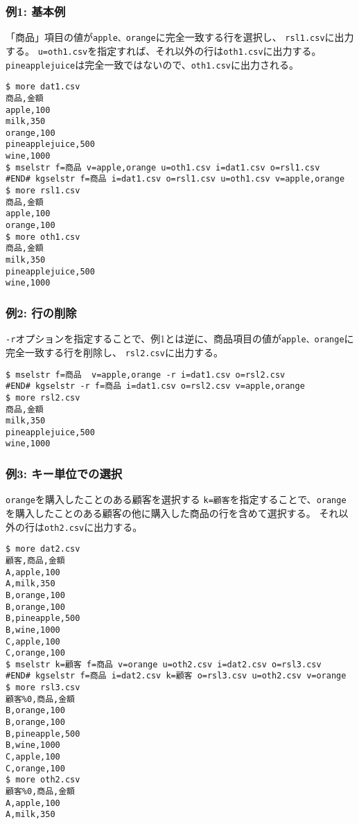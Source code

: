 \subsubsection*{例1: 基本例}

「商品」項目の値が\verb|apple、orange|に完全一致する行を選択し、
\verb|rsl1.csv|に出力する。
\verb|u=oth1.csv|を指定すれば、それ以外の行は\verb|oth1.csv|に出力する。
\verb|pineapplejuice|は完全一致ではないので、\verb|oth1.csv|に出力される。


\begin{Verbatim}[baselinestretch=0.7,frame=single]
$ more dat1.csv
商品,金額
apple,100
milk,350
orange,100
pineapplejuice,500
wine,1000
$ mselstr f=商品 v=apple,orange u=oth1.csv i=dat1.csv o=rsl1.csv
#END# kgselstr f=商品 i=dat1.csv o=rsl1.csv u=oth1.csv v=apple,orange
$ more rsl1.csv
商品,金額
apple,100
orange,100
$ more oth1.csv
商品,金額
milk,350
pineapplejuice,500
wine,1000
\end{Verbatim}
\subsubsection*{例2: 行の削除}

\verb|-r|オプションを指定することで、例1とは逆に、商品項目の値が\verb|apple、orange|に完全一致する行を削除し、
\verb|rsl2.csv|に出力する。


\begin{Verbatim}[baselinestretch=0.7,frame=single]
$ mselstr f=商品  v=apple,orange -r i=dat1.csv o=rsl2.csv
#END# kgselstr -r f=商品 i=dat1.csv o=rsl2.csv v=apple,orange
$ more rsl2.csv
商品,金額
milk,350
pineapplejuice,500
wine,1000
\end{Verbatim}
\subsubsection*{例3: キー単位での選択}

\verb|orange|を購入したことのある顧客を選択する
\verb|k=顧客|を指定することで、\verb|orange|を購入したことのある顧客の他に購入した商品の行を含めて選択する。
それ以外の行は\verb|oth2.csv|に出力する。


\begin{Verbatim}[baselinestretch=0.7,frame=single]
$ more dat2.csv
顧客,商品,金額
A,apple,100
A,milk,350
B,orange,100
B,orange,100
B,pineapple,500
B,wine,1000
C,apple,100
C,orange,100
$ mselstr k=顧客 f=商品 v=orange u=oth2.csv i=dat2.csv o=rsl3.csv
#END# kgselstr f=商品 i=dat2.csv k=顧客 o=rsl3.csv u=oth2.csv v=orange
$ more rsl3.csv
顧客%0,商品,金額
B,orange,100
B,orange,100
B,pineapple,500
B,wine,1000
C,apple,100
C,orange,100
$ more oth2.csv
顧客%0,商品,金額
A,apple,100
A,milk,350
\end{Verbatim}

